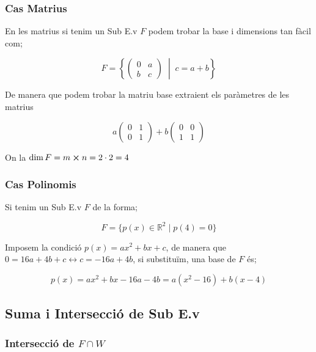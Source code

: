 \documentclass[12pt]{article}
\newcommand{\R}{\mathbb{R}}
\begin{document}
\subsubsection{Cas Matrius}

\begin{examplebox}{}
 
En les matrius si tenim un Sub E.v $F$ podem trobar la base i dimensions tan fàcil com;

    \[
F = \left\{
\begin{pmatrix}
    0 & a \\
    b & c
\end{pmatrix}
\;\middle|\;
c = a+b
\right\}
\]

De manera que podem trobar la matriu base extraient els paràmetres de les matrius

\[
a
\begin{pmatrix}
    0 & 1\\
    0 & 1
\end{pmatrix}
+
b
\begin{pmatrix}
    0 & 0\\
    1 & 1
\end{pmatrix}
\]

On la $\dim F = m\cross n = 2\cdot 2 = 4$
\end{examplebox}

\subsubsection{Cas Polinomis}

\begin{examplebox}{}
    Si tenim un Sub E.v $F$ de la forma;

    \[F = \{p(x) \in \R^2 \mid p(4) = 0\}\]

    Imposem la condició $p(x) = ax^2 + bx + c$, de manera que $0= 16a + 4b + c \leftrightarrow c = -16a + 4b$, si substituïm, una base de $F$ és;

    \[p(x) = ax^2 + bx - 16a - 4b = a(x^2 - 16)+ b(x - 4)\]
\end{examplebox}

\subsection{Suma i Intersecció de Sub E.v}

\subsubsection{Intersecció de \texorpdfstring{$F \cap W$}{F ∩ W}}
\end{document}
